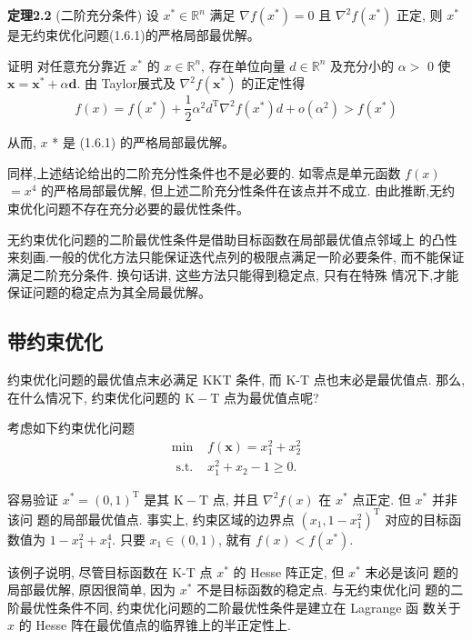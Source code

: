 \textbf{定理2.2} (二阶充分条件) 设 $x^{*} \in \mathbb{R}^{n}$ 满足 $\nabla f\left(x^{*}\right)=0$ 且 $\nabla^{2} f\left(x^{*}\right)$ 正定, 则 $x^{*}$ 是无约束优化问题(1.6.1)的严格局部最优解。

证明 对任意充分靠近 $x^{*}$ 的 $x \in \mathbb{R}^{n}$, 存在单位向量 $d \in \mathbb{R}^{n}$ 及充分小的 $\alpha>$ 0 使 $\boldsymbol{x}=\boldsymbol{x}^{*}+\alpha \boldsymbol{d}$. 由 Taylor展式及 $\nabla^{2} f\left(\boldsymbol{x}^{*}\right)$ 的正定性得
$$
f(x)=f\left(x^{*}\right)+\frac{1}{2} \alpha^{2} d^{\mathrm{T}} \nabla^{2} f\left(x^{*}\right) d+o\left(\alpha^{2}\right)>f\left(x^{*}\right)
$$

从而, $x$ * 是 (1.6.1) 的严格局部最优解。

同样,上述结论给出的二阶充分性条件也不是必要的. 如零点是单元函数 $f(x)$ $=x^{4}$ 的严格局部最优解, 但上述二阶充分性条件在该点并不成立. 由此推断,无约 束优化问题不存在充分必要的最优性条件。

无约束优化问题的二阶最优性条件是借助目标函数在局部最优值点邻域上 的凸性来刻画.一般的优化方法只能保证迭代点列的极限点满足一阶必要条件, 而不能保证满足二阶充分条件. 换句话讲, 这些方法只能得到稳定点, 只有在特殊 情况下,才能保证问题的稳定点为其全局最优解。
\subsection{带约束优化}
约束优化问题的最优值点末必满足 KKT 条件, 而 K-T 点也末必是最优值点. 那么, 在什么情况下, 约束优化问题的 $\mathrm{K}-\mathrm{T}$ 点为最优值点呢?

考虑如下约束优化问题
$$
\begin{array}{cl}
\min & f(\boldsymbol{x})=x_{1}^{2}+x_{2}^{2} \\
\text { s.t. } & x_{1}^{2}+x_{2}-1 \geqslant 0 .
\end{array}
$$

容易验证 $x^{*}=(0,1)^{\mathrm{T}}$ 是其 $\mathrm{K}-\mathrm{T}$ 点, 并且 $\nabla^{2} f(x)$ 在 $x^{*}$ 点正定. 但 $x^{*}$ 并非该问 题的局部最优值点. 事实上, 约束区域的边界点 $\left(x_{1}, 1-x_{1}^{2}\right)^{\mathrm{T}}$ 对应的目标函数值为 $1-x_{1}^{2}+x_{1}^{4}$. 只要 $x_{1} \in(0,1)$, 就有 $f(x)<f\left(x^{*}\right)$.

该例子说明, 尽管目标函数在 K-T 点 $x^{*}$ 的 Hesse 阵正定, 但 $x^{*}$ 末必是该问 题的局部最优解, 原因很简单, 因为 $x^{*}$ 不是目标函数的稳定点. 与无约束优化问 题的二阶最优性条件不同, 约束优化问题的二阶最优性条件是建立在 Lagrange 函 数关于 $x$ 的 Hesse 阵在最优值点的临界锥上的半正定性上.

